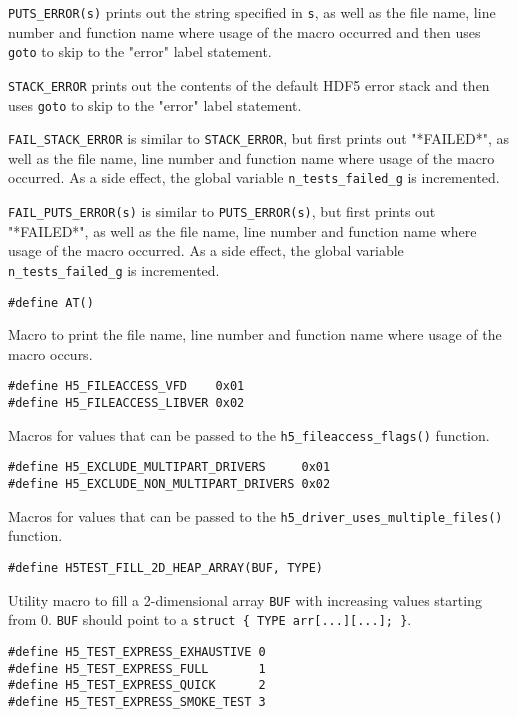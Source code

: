 \documentclass[../HDF5_RFC.tex]{subfiles}
\begin{document}
\texttt{PUTS\_ERROR(s)} prints out the string specified in \texttt{s}, as well as the file name, line
number and function name where usage of the macro occurred and then uses \texttt{goto} to skip to the
"error" label statement.

\texttt{STACK\_ERROR} prints out the contents of the default HDF5 error stack and then uses \texttt{goto}
to skip to the "error" label statement.

\texttt{FAIL\_STACK\_ERROR} is similar to \texttt{STACK\_ERROR}, but first prints out "*FAILED*", as well
as the file name, line number and function name where usage of the macro occurred. As a side effect, the global variable \texttt{n\_tests\_failed\_g} is incremented.

\texttt{FAIL\_PUTS\_ERROR(s)} is similar to \texttt{PUTS\_ERROR(s)}, but first prints out "*FAILED*", as
well as the file name, line number and function name where usage of the macro occurred. As a side effect,
the global variable \texttt{n\_tests\_failed\_g} is incremented.

\begin{verbatim}
#define AT()
\end{verbatim}

Macro to print the file name, line number and function name where usage of the macro occurs.

\begin{verbatim}
#define H5_FILEACCESS_VFD    0x01
#define H5_FILEACCESS_LIBVER 0x02
\end{verbatim}

Macros for values that can be passed to the \texttt{h5\_fileaccess\_flags()} function.

\begin{verbatim}
#define H5_EXCLUDE_MULTIPART_DRIVERS     0x01
#define H5_EXCLUDE_NON_MULTIPART_DRIVERS 0x02
\end{verbatim}

Macros for values that can be passed to the \texttt{h5\_driver\_uses\_multiple\_files()} function.

\begin{verbatim}
#define H5TEST_FILL_2D_HEAP_ARRAY(BUF, TYPE)
\end{verbatim}

Utility macro to fill a 2-dimensional array \texttt{BUF} with increasing values starting from 0.
\texttt{BUF} should point to a \texttt{struct \{ TYPE arr[...][...]; \}}.

\begin{verbatim}
#define H5_TEST_EXPRESS_EXHAUSTIVE 0
#define H5_TEST_EXPRESS_FULL       1
#define H5_TEST_EXPRESS_QUICK      2
#define H5_TEST_EXPRESS_SMOKE_TEST 3
\end{verbatim}
\end{document}
